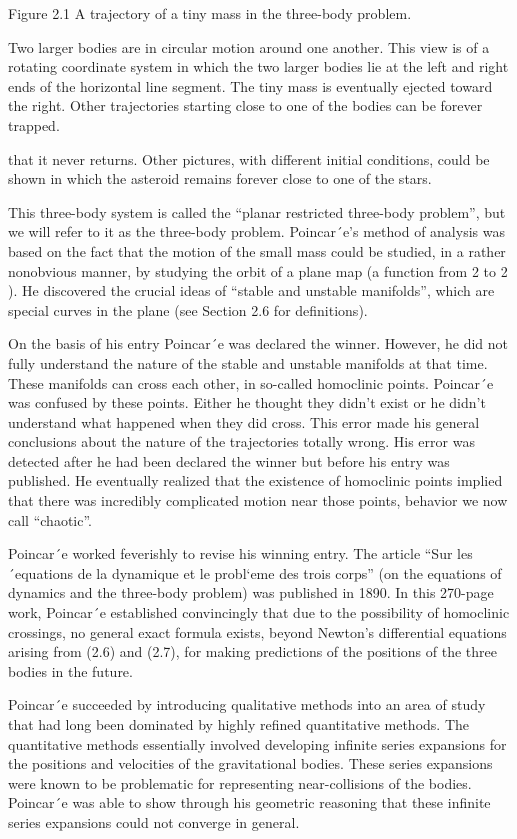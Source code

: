 \documentclass[12pt]{article}
\begin{document}
Figure 2.1 A trajectory of a tiny mass in the three-body problem.

Two larger bodies are in circular motion around one another. This view is of a rotating coordinate system in which the two larger 
bodies lie at the left and right ends of the horizontal line segment. The tiny mass is eventually ejected toward the right. Other 
trajectories starting close to one of the bodies can be forever trapped.


that it never returns. Other pictures, with different initial conditions, could be shown in which the asteroid remains forever close 
to one of the stars.

This three-body system is called the “planar restricted three-body problem”, but we will refer to it as the three-body problem. 
Poincar´e’s method of analysis was based on the fact that the motion of the small mass could be studied, in a rather nonobvious 
manner, by studying the orbit of a plane map (a function from  2 to  2 ). He discovered the crucial ideas of “stable and unstable 
manifolds”, which are special curves in the plane (see Section 2.6 for deﬁnitions).

On the basis of his entry Poincar´e was declared the winner. However, he did not fully understand the nature of the stable and 
unstable manifolds at that time. These manifolds can cross each other, in so-called homoclinic points. Poincar´e was confused by 
these points. Either he thought they didn’t exist or he didn’t understand what happened when they did cross. This error made his 
general conclusions about the nature of the trajectories totally wrong. His error was detected after he had been declared the winner 
but before his entry was published. He eventually realized that the existence of homoclinic points implied that there was incredibly 
complicated motion near those points, behavior we now call “chaotic”.

Poincar´e worked feverishly to revise his winning entry. The article “Sur les ´equations de la dynamique et le probl`eme des trois 
corps” (on the equations of dynamics and the three-body problem) was published in 1890. In this 270-page work, Poincar´e established 
convincingly that due to the possibility of homoclinic crossings, no general exact formula exists, beyond Newton’s differential 
equations arising from (2.6) and (2.7), for making predictions of the positions of the three bodies in the future.

Poincar´e succeeded by introducing qualitative methods into an area of study that had long been dominated by highly reﬁned 
quantitative methods. The quantitative methods essentially involved developing inﬁnite series expansions for the positions and 
velocities of the gravitational bodies. These series expansions were known to be problematic for representing near-collisions of the 
bodies. Poincar´e was able to show through his geometric reasoning that these inﬁnite series expansions could not converge in 
general.
\end{document}
